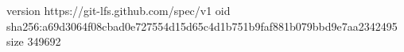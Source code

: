 version https://git-lfs.github.com/spec/v1
oid sha256:a69d3064f08cbad0e727554d15d65c4d1b751b9faf881b079bbd9e7aa2342495
size 349692
